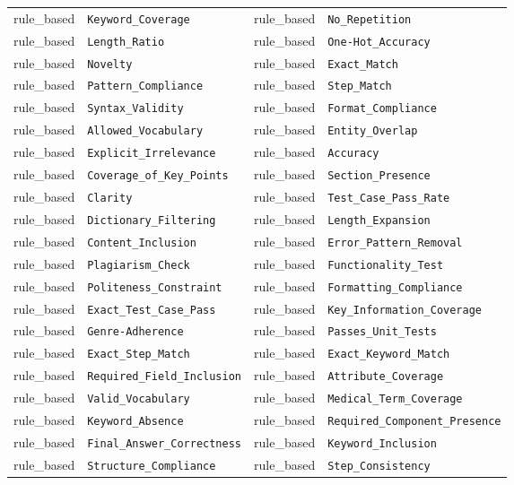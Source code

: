 {\begin{longtable}{|l|l|l|l|}
rule\_based & \texttt{Keyword\_Coverage} & rule\_based & \texttt{No\_Repetition} \\
rule\_based & \texttt{Length\_Ratio} & rule\_based & \texttt{One-Hot\_Accuracy} \\
rule\_based & \texttt{Novelty} & rule\_based & \texttt{Exact\_Match} \\
rule\_based & \texttt{Pattern\_Compliance} & rule\_based & \texttt{Step\_Match} \\
rule\_based & \texttt{Syntax\_Validity} & rule\_based & \texttt{Format\_Compliance} \\
rule\_based & \texttt{Allowed\_Vocabulary} & rule\_based & \texttt{Entity\_Overlap} \\
rule\_based & \texttt{Explicit\_Irrelevance} & rule\_based & \texttt{Accuracy} \\
rule\_based & \texttt{Coverage\_of\_Key\_Points} & rule\_based & \texttt{Section\_Presence} \\
rule\_based & \texttt{Clarity} & rule\_based & \texttt{Test\_Case\_Pass\_Rate} \\
rule\_based & \texttt{Dictionary\_Filtering} & rule\_based & \texttt{Length\_Expansion} \\
rule\_based & \texttt{Content\_Inclusion} & rule\_based & \texttt{Error\_Pattern\_Removal} \\
rule\_based & \texttt{Plagiarism\_Check} & rule\_based & \texttt{Functionality\_Test} \\
rule\_based & \texttt{Politeness\_Constraint} & rule\_based & \texttt{Formatting\_Compliance} \\
rule\_based & \texttt{Exact\_Test\_Case\_Pass} & rule\_based & \texttt{Key\_Information\_Coverage} \\
rule\_based & \texttt{Genre-Adherence} & rule\_based & \texttt{Passes\_Unit\_Tests} \\
rule\_based & \texttt{Exact\_Step\_Match} & rule\_based & \texttt{Exact\_Keyword\_Match} \\
rule\_based & \texttt{Required\_Field\_Inclusion} & rule\_based & \texttt{Attribute\_Coverage} \\
rule\_based & \texttt{Valid\_Vocabulary} & rule\_based & \texttt{Medical\_Term\_Coverage} \\
rule\_based & \texttt{Keyword\_Absence} & rule\_based & \texttt{Required\_Component\_Presence} \\
rule\_based & \texttt{Final\_Answer\_Correctness} & rule\_based & \texttt{Keyword\_Inclusion} \\
rule\_based & \texttt{Structure\_Compliance} & rule\_based & \texttt{Step\_Consistency} \\

\end{longtable}}
